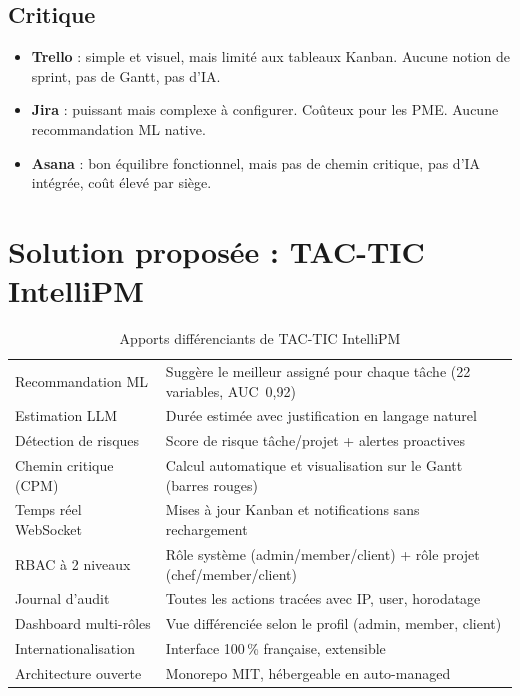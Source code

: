 \subsection{Critique}

\begin{itemize}
  \item \textbf{Trello} : simple et visuel, mais limité aux tableaux Kanban. Aucune
        notion de sprint, pas de Gantt, pas d'IA.
  \item \textbf{Jira} : puissant mais complexe à configurer. Coûteux pour les PME.
        Aucune recommandation ML native.
  \item \textbf{Asana} : bon équilibre fonctionnel, mais pas de chemin critique, pas
        d'IA intégrée, coût élevé par siège.
\end{itemize}

\section{Solution proposée : TAC-TIC IntelliPM}

\begin{table}[H]
  \centering
  \caption{Apports différenciants de TAC-TIC IntelliPM}
  \label{tab:apports}
  \begin{tabularx}{\textwidth}{L{4.5cm}X}
    \toprule
     &  \\
    \midrule
    Recommandation ML       & Suggère le meilleur assigné pour chaque tâche (22 variables, AUC~0,92) \\
    Estimation LLM          & Durée estimée avec justification en langage naturel \\
    Détection de risques    & Score de risque tâche/projet + alertes proactives \\
    Chemin critique (CPM)   & Calcul automatique et visualisation sur le Gantt (barres rouges) \\
    Temps réel WebSocket    & Mises à jour Kanban et notifications sans rechargement \\
    RBAC à 2 niveaux        & Rôle système (admin/member/client) + rôle projet (chef/member/client) \\
    Journal d'audit         & Toutes les actions tracées avec IP, user, horodatage \\
    Dashboard multi-rôles   & Vue différenciée selon le profil (admin, member, client) \\
    Internationalisation    & Interface 100\,\% française, extensible \\
    Architecture ouverte    & Monorepo MIT, hébergeable en auto-managed \\
    \bottomrule
  \end{tabularx}
\end{table}

